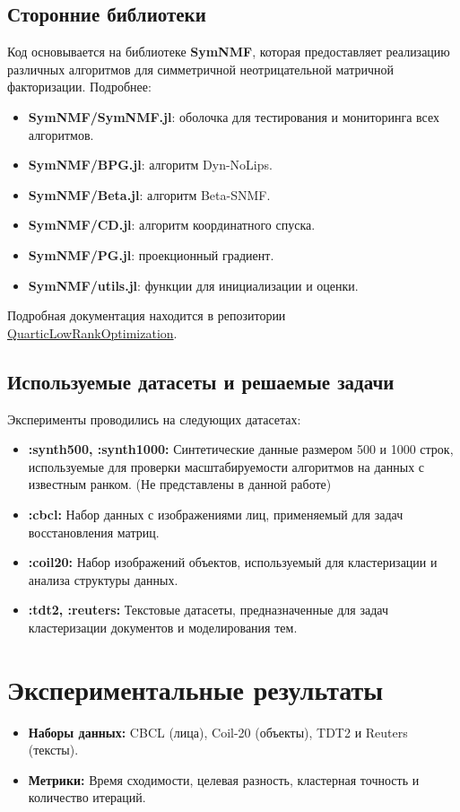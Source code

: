 \documentclass[a4paper,11pt]{article}
\begin{document}
\subsection{Сторонние библиотеки}
Код основывается на библиотеке \textbf{SymNMF}, которая предоставляет реализацию различных алгоритмов для симметричной неотрицательной матричной факторизации. Подробнее:
\begin{itemize}
    \item \textbf{SymNMF/SymNMF.jl}: оболочка для тестирования и мониторинга всех алгоритмов.
    \item \textbf{SymNMF/BPG.jl}: алгоритм Dyn-NoLips.
    \item \textbf{SymNMF/Beta.jl}: алгоритм Beta-SNMF.
    \item \textbf{SymNMF/CD.jl}: алгоритм координатного спуска.
    \item \textbf{SymNMF/PG.jl}: проекционный градиент.
    \item \textbf{SymNMF/utils.jl}: функции для инициализации и оценки.
\end{itemize}

Подробная документация находится в репозитории \href{https://github.com/RaduAlexandruDragomir/QuarticLowRankOptimization}{QuarticLowRankOptimization}.

\subsection{Используемые датасеты и решаемые задачи}
Эксперименты проводились на следующих датасетах:
\begin{itemize}
    \item \textbf{:synth500, :synth1000:} Синтетические данные размером 500 и 1000 строк, используемые для проверки масштабируемости алгоритмов на данных с известным ранком. (Не представлены в данной работе)
    \item \textbf{:cbcl:} Набор данных с изображениями лиц, применяемый для задач восстановления матриц.
    \item \textbf{:coil20:} Набор изображений объектов, используемый для кластеризации и анализа структуры данных.
    \item \textbf{:tdt2, :reuters:} Текстовые датасеты, предназначенные для задач кластеризации документов и моделирования тем.
\end{itemize}

\section{Экспериментальные результаты} 
\begin{itemize} 
	\item \textbf{Наборы данных:} CBCL (лица), Coil-20 (объекты), TDT2 и Reuters (тексты).
	\item \textbf{Метрики:} Время сходимости, целевая разность, кластерная точность и количество итераций.
\end{itemize}
\newpage
\end{document}
